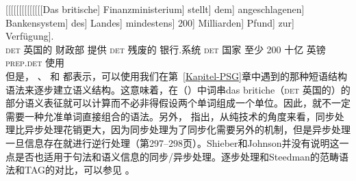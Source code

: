 \ea
\gll {}[[[[[[[[[[[[[[Das britische] Finanzministerium] stellt] dem] angeschlagenen] Bankensystem] des] Landes] mindestens] 200] Milliarden] Pfund] zur]~~~~~~~~~ Verfügung].\\
{}\spacebr{}\spacebr{}\spacebr{}\spacebr{}\spacebr{}\spacebr{}\spacebr{}\spacebr{}\spacebr{}\spacebr{}\spacebr{}\spacebr{}\spacebr{}\spacebr{}\textsc{det} 英国的 财政部 提供 \textsc{det}
残废的 银行.系统 \textsc{det} 国家 至少 200 十亿 英镑 \textsc{prep}.\textsc{det} 使用\\
\z
但是， \citet{Pulman85a}、 \citet{Stabler91a}和 \citet[--308]{SJ93a}都表示，可以使用我们在第~\ref{Kapitel-PSG}章中遇到的那种短语结构语法来逐步建立语义结构。这意味着，在（）中词串das britiche（\textsc{det} 英国的）的部分语义表征就可以计算而不必非得假设两个单词组成一个单位。因此，就不一定需要一种允准单词直接组合的语法。另外，  指出，从纯技术的角度来看，同步处理比异步处理花销更大，因为同步处理为了同步化需要另外的机制，但是异步处理一旦信息存在就进行逆行处理（第297--298页）。Shieber和Johnson并没有说明这一点是否也适用于句法和语义信息的同步/异步处理。逐步处理和Steedman的范畴语法\indexcgc 和TAG\indextagc 的对比，可以参见 。

